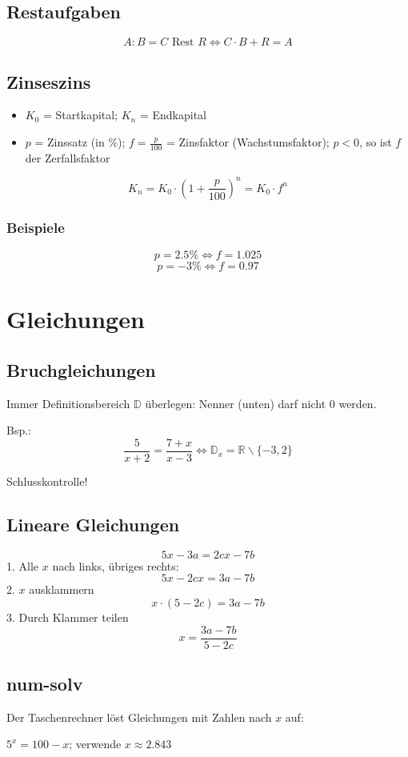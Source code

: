 \begin{multicols}{2}
\subsection{Restaufgaben}
$$A:B = C \textrm{ Rest } R \Longleftrightarrow{}  C\cdot{}B+R = A$$

\subsection{Zinseszins}
\begin{itemize}
\item $K_0$ = Startkapital; $K_n$ = Endkapital
\item $p$ = Zinssatz (in \%); $f = \frac{p}{100}$ = Zinsfaktor
(Wachstumsfaktor); $p<0$, so ist $f$ der Zerfallsfaktor
\end{itemize}
$$K_n = K_0 \cdot{} \left( 1+\frac{p}{100} \right)^n = K_0\cdot{}f^n$$

\subsubsection{Beispiele}
$$p = 2.5\% \Longleftrightarrow{} f = 1.025$$
$$p = -3\% \Longleftrightarrow{} f = 0.97$$


\hrulefill
\section{Gleichungen}

\subsection{Bruchgleichungen}
Immer Definitionsbereich $\mathbb{D}$ überlegen: Nenner (unten) darf
nicht 0 werden.

Bsp.: $$\frac5{x+2}=\frac{7+x}{x-3} \Leftrightarrow{} \mathbb{D}_x=\mathbb{R}\backslash{}\{-3, 2\}$$

Schlusskontrolle!



\subsection{Lineare Gleichungen}
$$5x-3a = 2cx-7b$$
1. Alle $x$ nach links, übriges rechts:
$$5x - 2cx = 3a-7b$$
2. $x$ ausklammern
$$x\cdot{}(5-2c) = 3a-7b$$
3. Durch Klammer teilen
$$x = \frac{3a-7b}{5-2c}$$


\subsection{num-solv}
Der Taschenrechner löst Gleichungen mit Zahlen nach $x$ auf:

$5^x = 100 -x$; verwende  $x\approx{}2.843$


\end{multicols}


